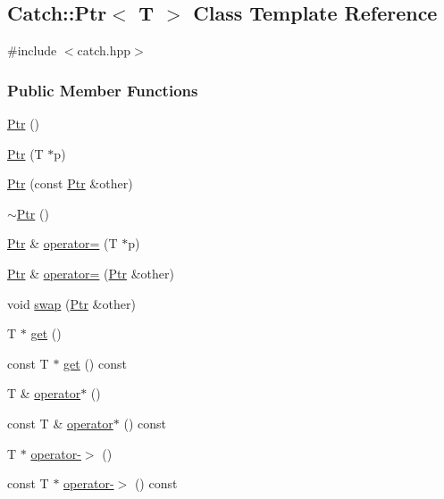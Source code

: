 \hypertarget{classCatch_1_1Ptr}{\subsection{Catch\-:\-:Ptr$<$ T $>$ Class Template Reference}
\label{classCatch_1_1Ptr}
}


{\ttfamily \#include $<$catch.\-hpp$>$}

\subsubsection*{Public Member Functions}
\begin{DoxyCompactItemize}
\item 
\hyperlink{classCatch_1_1Ptr_a6108f0195595ee9d7a411daea810beaf}{Ptr} ()
\item 
\hyperlink{classCatch_1_1Ptr_aacec063a79cd142e39040a31c6b3c40b}{Ptr} (T $\ast$p)
\item 
\hyperlink{classCatch_1_1Ptr_a69bea9e8deedd285cf22916a0b8ee014}{Ptr} (const \hyperlink{classCatch_1_1Ptr}{Ptr} \&other)
\item 
\hyperlink{classCatch_1_1Ptr_ac96d3bb33adcfb983207385cfba5fe8a}{$\sim$\-Ptr} ()
\item 
\hyperlink{classCatch_1_1Ptr}{Ptr} \& \hyperlink{classCatch_1_1Ptr_a9b08c868b447d679ed201921f5c94683}{operator=} (T $\ast$p)
\item 
\hyperlink{classCatch_1_1Ptr}{Ptr} \& \hyperlink{classCatch_1_1Ptr_aef9b11ce6f90aee5267c0f309600374a}{operator=} (\hyperlink{classCatch_1_1Ptr}{Ptr} \&other)
\item 
void \hyperlink{classCatch_1_1Ptr_a172bf8b4e71e26a5a4d92f5b02158b50}{swap} (\hyperlink{classCatch_1_1Ptr}{Ptr} \&other)
\item 
T $\ast$ \hyperlink{classCatch_1_1Ptr_a0123036c2fca74afceea9c0e3e5cc01b}{get} ()
\item 
const T $\ast$ \hyperlink{classCatch_1_1Ptr_abf6f4d2d554086d9a2606add07716a16}{get} () const 
\item 
T \& \hyperlink{classCatch_1_1Ptr_a5d68c1d007b910e06468f08d31dfe350}{operator$\ast$} ()
\item 
const T \& \hyperlink{classCatch_1_1Ptr_a756385ed7d8cd01035d886f53621bf4e}{operator$\ast$} () const 
\item 
T $\ast$ \hyperlink{classCatch_1_1Ptr_a3ac95cf74ee69b51f343ebced69ad4f8}{operator-\/$>$} ()
\item 
const T $\ast$ \hyperlink{classCatch_1_1Ptr_a26829f143e059135034535bc132139ce}{operator-\/$>$} () const 
\end{DoxyCompactItemize}


